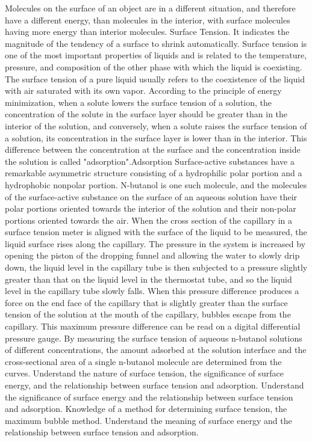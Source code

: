\begin{abstract*}
  Molecules on the surface of an object are in a different situation, and therefore have a different energy, than molecules in the interior, with surface molecules having more energy than interior molecules.
  Surface Tension. It indicates the magnitude of the tendency of a surface to shrink automatically.
  Surface tension is one of the most important properties of liquids and is related to the temperature, pressure, and composition of the other phase with which the liquid is coexisting.
  The surface tension of a pure liquid usually refers to the coexistence of the liquid with air saturated with its own vapor.
  According to the principle of energy minimization, when a solute lowers the surface tension of a solution, the concentration of the solute in the surface layer should be greater than in the interior of the solution, and conversely, when a solute raises the surface tension of a solution, its concentration in the surface layer is lower than in the interior.
  This difference between the concentration at the surface and the concentration inside the solution is called "adsorption".Adsorption
  Surface-active substances have a remarkable asymmetric structure consisting of a hydrophilic polar portion and a hydrophobic nonpolar portion.
  N-butanol is one such molecule, and the molecules of the surface-active substance on the surface of an aqueous solution have their polar portions oriented towards the interior of the solution and their non-polar portions oriented towards the air.
  When the cross section of the capillary in a surface tension meter is aligned with the surface of the liquid to be measured, the liquid surface rises along the capillary.
  The pressure in the system is increased by opening the piston of the dropping funnel and allowing the water to slowly drip down, the liquid level in the capillary tube is then subjected to a pressure slightly greater than that on the liquid level in the thermostat tube, and so the liquid level in the capillary tube slowly falls.
  When this pressure difference produces a force on the end face of the capillary that is slightly greater than the surface tension of the solution at the mouth of the capillary, bubbles escape from the capillary.
  This maximum pressure difference can be read on a digital differential pressure gauge.
  By measuring the surface tension of aqueous n-butanol solutions of different concentrations, the amount adsorbed at the solution interface and the cross-sectional area of a single n-butanol molecule are determined from the curves.
  Understand the nature of surface tension, the significance of surface energy, and the relationship between surface tension and adsorption.  Understand the significance of surface energy and the relationship between surface tension and adsorption.
  Knowledge of a method for determining surface tension, the maximum bubble method.  Understand the meaning of surface energy and the relationship between surface tension and adsorption.
\end{abstract*}
